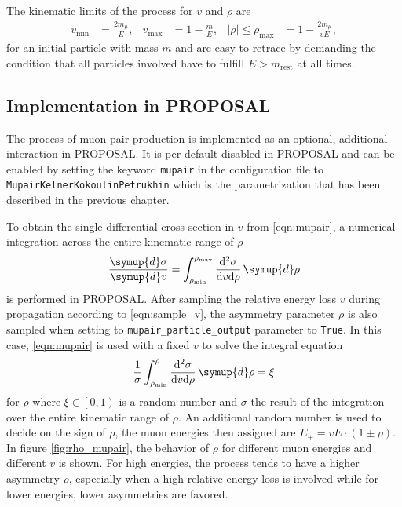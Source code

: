 The kinematic limits of the process for $v$ and $\rho$ are
%
\begin{align}
    v_\text{min} &= \frac{2 m_{\mu}}{E}, & v_\text{max} &= 1 - \frac{m}{E}, & \left| \rho \right| \leq \rho_{\text{max}} &= 1 - \frac{2 m_{\mu}}{v E},
\end{align}
%
for an initial particle with mass $m$ and are easy to retrace by demanding the condition that all particles involved have to fulfill $E > m_{\text{rest}}$ at all times.

\subsection{Implementation in PROPOSAL}
\label{sec:mupair_implementation}

\begin{sloppypar}
The process of muon pair production is implemented as an optional, additional interaction in PROPOSAL.
It is per default disabled in PROPOSAL and can be enabled by setting the keyword \texttt{mupair} in the configuration file to \texttt{MupairKelnerKokoulinPetrukhin} which is the parametrization that has been described in the previous chapter.
\end{sloppypar}

\begin{sloppypar}
To obtain the single-differential cross section in $v$ from \eqref{eqn:mupair}, a numerical integration across the entire kinematic range of $\rho$
%
\begin{equation}
    \frac{\symup{d}\sigma}{\symup{d}v} = \int_{\rho_{\text{min}}}^{\rho_{\text{max}}} \frac{\mathrm{d}^2\sigma}{\mathrm{d}v \mathrm{d}\rho} \, \symup{d}\rho
\end{equation}
%
is performed in PROPOSAL.
After sampling the relative energy loss $v$ during propagation according to \eqref{eqn:sample_v}, the asymmetry parameter $\rho$ is also sampled when setting to \texttt{mupair\_particle\_output} parameter to \texttt{True}.
In this case, \eqref{eqn:mupair} is used with a fixed $v$ to solve the integral equation
\begin{equation}
    \frac{1}{\sigma} \int_{\rho_\text{min}}^{\rho} \frac{\mathrm{d}^2\sigma}{\mathrm{d}v \mathrm{d}\rho} \, \symup{d}\rho = \xi
\end{equation}
for $\rho$ where $\xi \in \left[0,1\right)$ is a random number and $\sigma$ the result of the integration over the entire kinematic range of $\rho$.
An additional random number is used to decide on the sign of $\rho$, the muon energies then assigned are $E_{\pm} = v E \cdot(1 \pm \rho)$.
In figure \ref{fig:rho_mupair}, the behavior of $\rho$ for different muon energies and different $v$ is shown.
For high energies, the process tends to have a higher asymmetry $\rho$, especially when a high relative energy loss is involved while for lower energies, lower asymmetries are favored.
\end{sloppypar}


